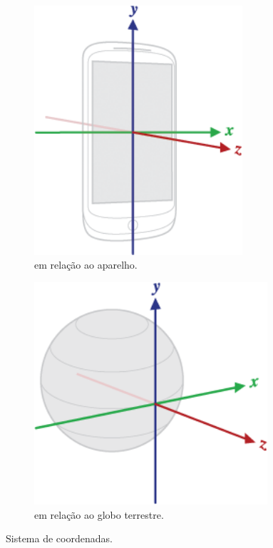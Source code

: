 \begin{figure}[H]
	\centering
	\begin{subfigure}{.5\textwidth}
		\includegraphics[width=0.85\textwidth]{figuras/axis_device.png}
		\caption{em relação ao aparelho.}
		\label{fig:axisdevice}
	\end{subfigure}%
	\begin{subfigure}{.5\textwidth}
		\includegraphics[width=0.95\textwidth]{figuras/axis_globe.png}
		\caption{em relação ao globo terrestre.}
		\label{fig:axisglobe}
	\end{subfigure}
	\caption{Sistema de coordenadas.}
\end{figure}

